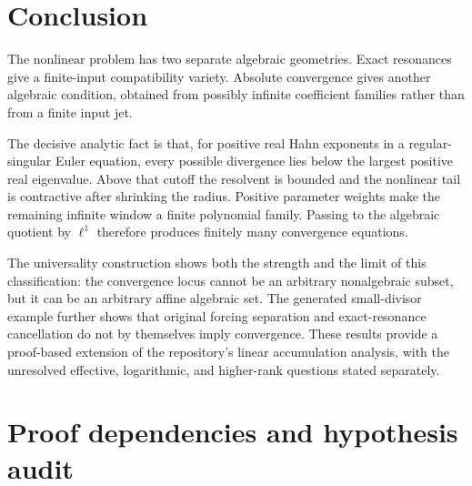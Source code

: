 \documentclass[11pt,a4paper]{article}
\numberwithin{equation}{section}
\theoremstyle{definition}
\theoremstyle{remark}
\begin{document}
\section{Conclusion}

The nonlinear problem has two separate algebraic geometries. Exact
resonances give a finite-input compatibility variety. Absolute convergence
gives another algebraic condition, obtained from possibly infinite
coefficient families rather than from a finite input jet.

The decisive analytic fact is that, for positive real Hahn exponents in a
regular-singular Euler equation, every possible divergence lies below the
largest positive real eigenvalue. Above that cutoff the resolvent is
bounded and the nonlinear tail is contractive after shrinking the radius.
Positive parameter weights make the remaining infinite window a finite
polynomial family. Passing to the algebraic quotient by $\ell^1$ therefore
produces finitely many convergence equations.

The universality construction shows both the strength and the limit of
this classification: the convergence locus cannot be an arbitrary
nonalgebraic subset, but it can be an arbitrary affine algebraic set.
The generated small-divisor example further shows that original forcing
separation and exact-resonance cancellation do not by themselves imply
convergence. These results provide a proof-based extension of the
repository's linear accumulation analysis, with the unresolved effective,
logarithmic, and higher-rank questions stated separately.

\appendix
\section{Proof dependencies and hypothesis audit}
\label{app:audit}
\end{document}
